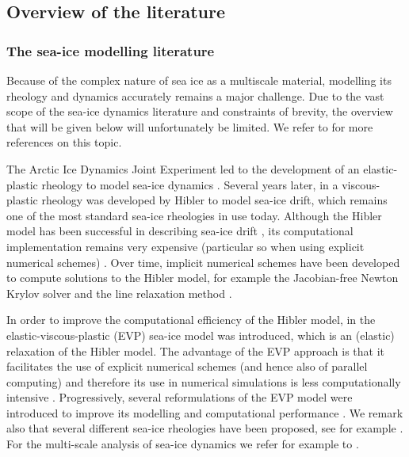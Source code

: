 \documentclass[12pt,a4paper]{article}
\theoremstyle{definition}
\theoremstyle{remark}
\numberwithin{equation}{section}
\begin{document}
\subsection{Overview of the literature}
\subsubsection{The sea-ice modelling literature}
Because of the complex nature of sea ice as a multiscale material, modelling its rheology and dynamics accurately remains a major challenge. Due to the vast scope of the sea-ice dynamics literature and constraints of brevity, the overview that will be given below will unfortunately be limited. We refer to \cite{boutros2025} for more references on this topic. 

The Arctic Ice Dynamics Joint Experiment led to the development of an elastic-plastic rheology to model sea-ice dynamics \cite{coon}. Several years later, in \cite{hibler} a viscous-plastic rheology was developed by Hibler to model sea-ice drift, which remains one of the most standard sea-ice rheologies in use today. Although the Hibler model has been successful in describing sea-ice drift \cite{losch}, its computational implementation remains very expensive (particular so when using explicit numerical schemes) \cite{bouillon2009,ip,koldunov}. Over time, implicit numerical schemes have been developed to compute solutions to the Hibler model, for example the Jacobian-free Newton Krylov solver \cite{lemieux,losch2014,seinen} and the line relaxation method \cite{zhang}.

In order to improve the computational efficiency of the Hibler model, in \cite{hunke} the elastic-viscous-plastic (EVP) sea-ice model was introduced, which is an (elastic) relaxation of the Hibler model. The advantage of the EVP approach is that it facilitates the use of explicit numerical schemes (and hence also of parallel computing) and therefore its use in numerical simulations is less computationally intensive \cite{hunke2002,hunkelinearization,bouillon2009}. Progressively, several reformulations of the EVP model were introduced to improve its modelling and computational performance \cite{hunkelinearization,bouillon}. We remark also that several different sea-ice rheologies have been proposed, see for example \cite{dansereau,tsamados,wilchinsky,heorton2018}. For the multi-scale analysis of sea-ice dynamics we refer for example to \cite{chen,deng,toppaladoddi}. 
\end{document}
